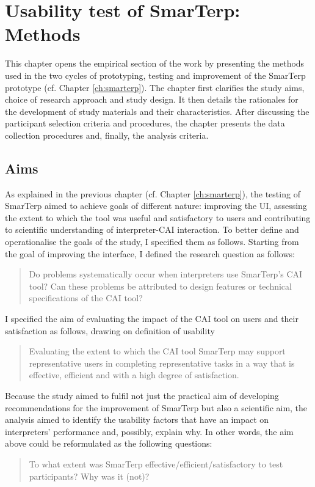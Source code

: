 \chapter{Usability test of SmarTerp: Methods}\label{ch:methods}
This chapter opens the empirical section of the work by presenting the methods used in the two cycles of prototyping, testing and improvement of the SmarTerp prototype (cf. Chapter \ref{ch:smarterp}). The chapter first clarifies the study aims, choice of research approach and study design. It then details the rationales for the development of study materials and their characteristics. After discussing the participant selection criteria and procedures, the chapter presents the data collection procedures and, finally, the analysis criteria.

\section{Aims}

As explained in the previous chapter (cf. Chapter \ref{ch:smarterp}), the testing of SmarTerp aimed to achieve goals of different nature: improving the UI, assessing the extent to which the tool was useful and satisfactory to users and contributing to scientific understanding of interpreter-CAI interaction. To better define and operationalise the goals of the study, I specified them as follows. Starting from the goal of improving the interface, I defined the research question as follows:
\begin{quote}
    Do problems systematically occur when interpreters use SmarTerp’s CAI tool? Can these problems be attributed to design features or technical specifications of the CAI tool?
\end{quote}
I specified the aim of evaluating the impact of the CAI tool on users and their satisfaction as follows, drawing on  definition of usability
\begin{quote}
    Evaluating the extent to which the CAI tool SmarTerp may support representative users in completing representative tasks in a way that is effective, efficient and with a high degree of satisfaction.
\end{quote}
Because the study aimed to fulfil not just the practical aim of developing recommendations for the improvement of SmarTerp but also a scientific aim, the analysis aimed to identify the usability factors that have an impact on interpreters’ performance and, possibly, explain why. In other words, the aim above could be reformulated as the following questions:
\begin{quote}
    To what extent was SmarTerp effective\slash efficient\slash satisfactory to test participants? Why was it (not)?
\end{quote}


